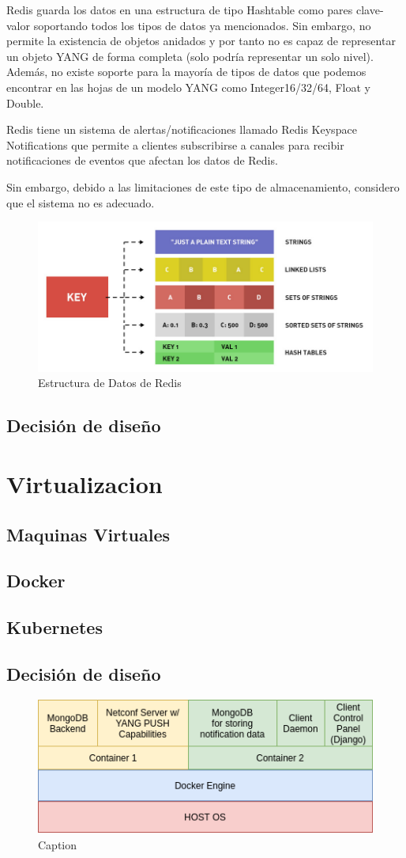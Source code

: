 Redis guarda los datos en una estructura de tipo Hashtable como pares clave-valor soportando todos los
tipos de datos ya mencionados. Sin embargo, no permite la existencia de objetos anidados y por tanto no es capaz de representar un objeto YANG de forma completa (solo podría representar un solo nivel).
Además, no existe soporte para la mayoría de tipos de datos que podemos encontrar en las hojas de un modelo YANG como Integer16/32/64, Float y Double.

Redis tiene un sistema de alertas/notificaciones llamado Redis Keyspace Notifications que permite
a clientes subscribirse a canales para recibir notificaciones de eventos que afectan los datos de Redis. 

Sin embargo, debido a las limitaciones de este tipo de almacenamiento, considero que el sistema no es adecuado.

\begin{figure}
    \centering
    \includegraphics[width=15cm]{graphics/redis-data-structure-types.jpeg}
    \caption{Estructura de Datos de Redis}
    \label{fig:redis_estructura}
\end{figure}

\subsection{Decisión de diseño}


\section{Virtualizacion}
  \subsection{Maquinas Virtuales}
  \subsection{Docker}
  \subsection{Kubernetes}
\subsection{Decisión de diseño}

\begin{figure}
    \centering
    \includegraphics{graphics/docker.png}
    \caption{Caption}
    \label{fig:my_label}
\end{figure}

